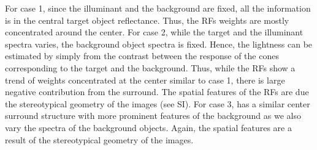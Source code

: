 \documentclass{jov}
\begin{document}
For case 1, since the illuminant and the background are fixed, all the information is in the central target object reflectance. Thus, the RFs weights are mostly concentrated around the center. For case 2, while the target and the illuminant spectra varies, the background object spectra is fixed. Hence, the lightness can be estimated by simply from the contrast between the response of the cones corresponding to the target and the background. Thus, while the RFs show a trend of weights concentrated at the center similar to case 1, there is large negative contribution from the surround. The spatial features of the RFs are due the stereotypical geometry of the images (see SI). For case 3, has a similar center surround structure with more prominent features of the background as we also vary the spectra of the background objects. Again, the spatial features are a result of the stereotypical geometry of the images.
\end{document}
